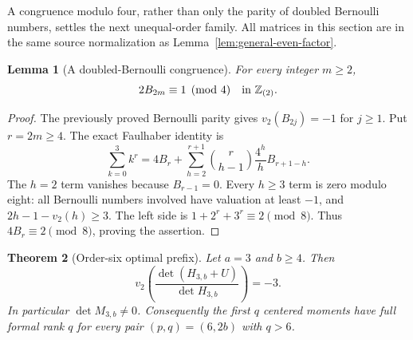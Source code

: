 \documentclass[11pt,a4paper]{article}
\numberwithin{equation}{section}
\theoremstyle{plain}
\newtheorem{theorem}{Theorem}[section]
\newtheorem{lemma}[theorem]{Lemma}
\theoremstyle{definition}
\theoremstyle{remark}
\begin{document}
A congruence modulo four, rather than only the parity of doubled
Bernoulli numbers, settles the next unequal-order family.  All matrices
in this section are in the same source normalization as
Lemma~\ref{lem:general-even-factor}.

\begin{lemma}[A doubled-Bernoulli congruence]\label{rs:Bernoulli-mod-four}
For every integer $m\ge2$,
\[
 2B_{2m}\equiv1\pmod4\quad\hbox{in }\mathbb Z_{(2)}.
\]
\end{lemma}
\begin{proof}
The previously proved Bernoulli parity gives $v_2(B_{2j})=-1$
for $j\ge1$. Put $r=2m\ge4$. The exact Faulhaber identity is
\[
 \sum_{k=0}^3k^r
 =4B_r+\sum_{h=2}^{r+1}
          \binom r{h-1}\frac{4^h}{h}B_{r+1-h}.
\]
The $h=2$ term vanishes because $B_{r-1}=0$. Every $h\ge3$ term
is zero modulo eight: all Bernoulli numbers involved have valuation
at least $-1$, and
$2h-1-v_2(h)\ge3$. The left side is
$1+2^r+3^r\equiv2\pmod8$.
Thus $4B_r\equiv2\pmod8$, proving the assertion.
\end{proof}

\begin{theorem}[Order-six optimal prefix]\label{rs:main}
Let $a=3$ and $b\ge4$. Then
\[
 v_2\!\left(\frac{\det(H_{3,b}+U)}{\det H_{3,b}}\right)=-3.
\]
In particular $\det M_{3,b}\ne0$. Consequently the first $q$
centered moments have full formal rank $q$ for every pair
$(p,q)=(6,2b)$ with $q>6$.
\end{theorem}
\end{document}
